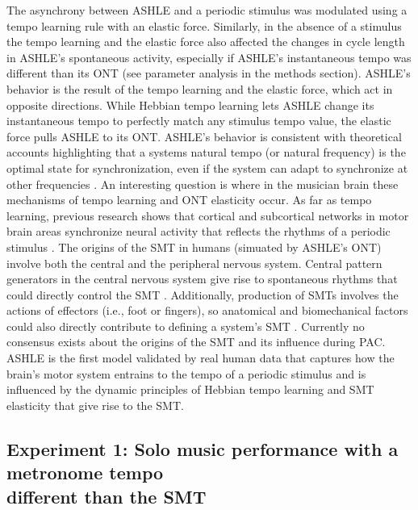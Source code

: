 \documentclass{report}
\begin{document}
The asynchrony between ASHLE and a periodic stimulus was modulated using a tempo learning rule with an elastic force. Similarly, in the absence of a stimulus the tempo learning and the elastic force also affected the changes in cycle length in ASHLE's spontaneous activity, especially if ASHLE's instantaneous tempo was different than its ONT (see parameter analysis in the methods section). ASHLE's behavior is the result of the tempo learning and the elastic force, which act in opposite directions. While Hebbian tempo learning lets ASHLE change its instantaneous tempo to perfectly match any stimulus tempo value, the elastic force pulls ASHLE to its ONT. ASHLE's behavior is consistent with theoretical accounts highlighting that a systems natural tempo (or natural frequency) is the optimal state for synchronization, even if the system can adapt to synchronize at other frequencies \cite{von1937nature, haken1985theoretical, kelso1997relative, scheurich2018tapping}. An interesting question is where in the musician brain these mechanisms of tempo learning and ONT elasticity occur. As far as tempo learning, previous research shows that cortical and subcortical networks in motor brain areas synchronize neural activity that reflects the rhythms of a periodic stimulus \cite{large2015neural, chen2008moving, grahn2009feeling, fujioka2012internalized}. The origins of the SMT in humans (simuated by ASHLE's ONT) involve both the central and the peripheral nervous system. Central pattern generators in the central nervous system give rise to spontaneous rhythms that could directly control the SMT \cite{latash1992virtual}. Additionally, production of SMTs involves the actions of effectors (i.e., foot or fingers), so anatomical and biomechanical factors could also directly contribute to defining a system's SMT \cite{goodman2000advantages}. Currently no consensus exists about the origins of the SMT and its influence during PAC. ASHLE is the first model validated by real human data that captures how the brain's motor system entrains to the tempo of a periodic stimulus and is influenced by the dynamic principles of Hebbian tempo learning and SMT elasticity that give rise to the SMT.

\subsection{Experiment 1: Solo music performance with a metronome tempo \\ different than the SMT}
\end{document}
